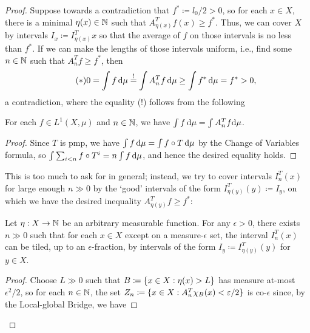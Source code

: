\documentclass[reqno, twoside]{article}
\begin{document}
\begin{proof}
        Suppose towards a contradiction that $f^\ast\coloneqq l_0/2>0$, so for each $x\in X$, there is a minimal $\eta(x)\in\mathbb{N}$ such that $A_{\eta(x)}^Tf(x)\geq f^\ast$. Thus, we can cover $X$ by intervals $I_x\coloneqq I_{\eta(x)}^Tx$ so that the average of $f$ on those intervals is no less than $f^\ast$. If we can make the lengths of those intervals uniform, i.e., find some $n\in\mathbb{N}$ such that $A_n^Tf\geq f^\ast$, then
        \begin{equation}\tag{$\ast$}
            0=\int f\,\mathrm{d}\mu\overset{!}{=}\int A_n^Tf\,\mathrm{d}\mu\geq\int f^\ast\,\mathrm{d}\mu=f^\ast>0,
        \end{equation}
        a contradiction, where the equality (!) follows from the following
        \begin{center}
            \begin{minipage}{0.95\textwidth}
                \begin{lemma}
                    For each $f\in L^1(X,\mu)$ and $n\in\mathbb{N}$, we have $\int f\,\mathrm{d}\mu=\int A_n^Tf\mathrm{d}\mu$.
                \end{lemma}
                \begin{proof}
                    Since $T$ is pmp, we have $\int f\,\mathrm{d}\mu=\int f\circ T\,\mathrm{d}\mu$ by the Change of Variables formula, so $\int\sum_{i<n}f\circ T^i=n\int f\,\mathrm{d}\mu$, and hence the desired equality holds.\qedlem
                \end{proof}
            \end{minipage}
        \end{center}
        This is too much to ask for in general; instead, we try to cover intervals $I_n^T(x)$ for large enough $n\gg0$ by the `good' intervals of the form $I^T_{\eta(y)}(y)\coloneqq I_y$, on which we have the desired inequality $A^T_{\eta(y)}f\geq f^\ast$:
        \begin{center}
            \begin{minipage}{0.95\textwidth}
                \begin{lemma}
                    Let $\eta:X\to\mathbb{N}$ be an arbitrary measurable function. For any $\epsilon>0$, there exists $n\gg0$ such that for each $x\in X$ except on a measure-$\epsilon$ set, the interval $I_n^T(x)$ can be tiled, up to an $\epsilon$-fraction, by intervals of the form $I_y\coloneqq I_{\eta(y)}^T(y)$ for $y\in X$.
                \end{lemma}
                \begin{proof}
                    Choose $L\gg0$ such that $B\coloneqq\left\{x\in X:\eta(x)>L\right\}$ has measure at-most $\epsilon^2/2$, so for each $n\in\mathbb{N}$, the set $Z_n\coloneqq\{x\in X: A_n^T\chi_B(x)<\varepsilon/2\}$ is co-$\epsilon$ since, by the Local-global Bridge, we have

\end{proof}
\end{minipage}
\end{center}
\end{proof}
\end{document}
